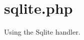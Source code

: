 \hypertarget{sqlite_8php-example}{
\section{sqlite.php}
}
Using the Sqlite handler.


\begin{DoxyCodeInclude}
\end{DoxyCodeInclude}
 